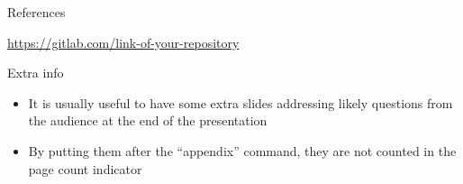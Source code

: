 \documentclass[xcolor={usenames,svgnames,dvipsnames},brazil,english,12pt,aspectratio=149]{beamer}
\begin{document}
\begin{frame}[allowframebreaks]{References}
  \printbibliography
\end{frame}

\begin{frame}{\insertshorttitle}
  \overview

  {
    \centering\noindent%
    \url{https://gitlab.com/link-of-your-repository}\par
  }

\end{frame}

\showqrcode

\appendix

\begin{frame}{Extra info}
  \begin{itemize}
    \item It is usually useful to have some extra slides addressing likely questions from the audience at the end of the presentation
    \item By putting them after the ``appendix'' command, they are not counted in the page count indicator
  \end{itemize}
\end{frame}
\end{document}
